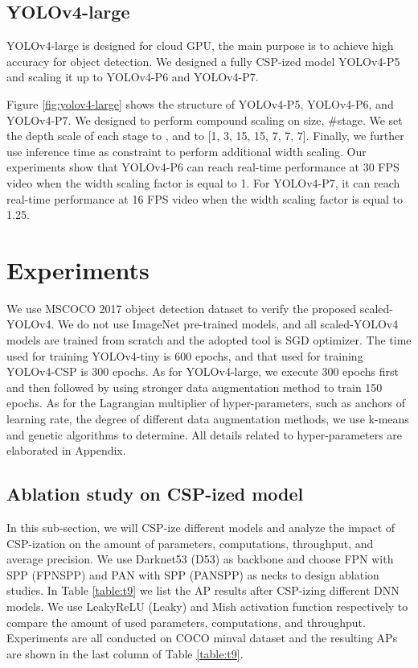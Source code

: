 \documentclass[10pt,twocolumn,letterpaper]{article}
\begin{document}
\subsection{YOLOv4-large}

YOLOv4-large is designed for cloud GPU, the main purpose is to achieve high accuracy for object detection. We designed a fully CSP-ized model YOLOv4-P5 and scaling it up to YOLOv4-P6 and YOLOv4-P7.

Figure \ref{fig:yolov4-large} shows the structure of YOLOv4-P5, YOLOv4-P6, and YOLOv4-P7.  We designed to perform compound scaling on {size, \#stage}.  We set the depth scale of each stage to , and  to [1, 3, 15, 15, 7, 7, 7].  Finally, we further use inference time as constraint to perform additional width scaling.  Our experiments show that YOLOv4-P6 can reach real-time performance at 30 FPS video when the width scaling factor is equal to 1.  For YOLOv4-P7, it can reach real-time performance at 16 FPS video when the width scaling factor is equal to 1.25.

\section{Experiments}

We use MSCOCO 2017 object detection dataset to verify the proposed scaled-YOLOv4.  We do not use ImageNet pre-trained models, and all scaled-YOLOv4 models are trained from scratch and the adopted tool is SGD optimizer.  The time used for training YOLOv4-tiny is 600 epochs, and that used for training YOLOv4-CSP is 300 epochs.  As for YOLOv4-large, we execute 300 epochs first and then followed by using stronger data augmentation method to train 150 epochs.  As for the Lagrangian multiplier of hyper-parameters, such as anchors of learning rate, the degree of different data augmentation methods, we use k-means and genetic algorithms to determine.  All details related to hyper-parameters are elaborated in Appendix.

\subsection{Ablation study on CSP-ized model}

In this sub-section, we will CSP-ize different models and analyze the impact of CSP-ization on the amount of parameters, computations, throughput, and average precision.  We use Darknet53 (D53) as backbone and choose FPN with SPP (FPNSPP) and PAN with SPP (PANSPP) as necks to design ablation studies.  In Table \ref{table:t9} we list the AP results after CSP-izing different DNN models.  We use LeakyReLU (Leaky) and Mish activation function respectively to compare the amount of used parameters, computations, and throughput.  Experiments are all conducted on COCO minval dataset and the resulting APs are shown in the last column of Table \ref{table:t9}.
\end{document}
